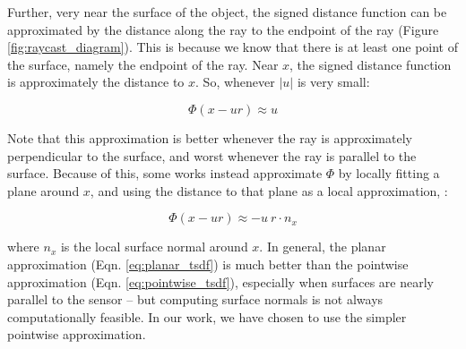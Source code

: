 \documentclass[10pt,twocolumn,letterpaper]{article}
\begin{document}
Further, very near the surface of the object, the signed distance function can
be approximated by the distance along the ray to the endpoint of  the ray
(Figure \ref{fig:raycast_diagram}). This is because we know that there is at
least one point of the surface, namely the endpoint of the ray.  Near $x$, the
signed distance function is approximately the distance to $x$. So, whenever
$|u|$ is very small:

\begin{equation} 
\label{eq:pointwise_tsdf} 
	\Phi(x - ur) \approx u 
\end{equation}

Note that this approximation is better whenever the ray is approximately
perpendicular to the surface, and worst whenever the ray is parallel to the
surface. Because of this, some works \cite{Bylow2013} instead approximate
$\Phi$ by locally fitting a plane around $x$, and using the distance to that
plane as a local approximation, \ie:

\begin{equation} 
\label{eq:planar_tsdf} 
	\Phi(x - ur) \approx -u~r \cdot n_x
\end{equation}

\noindent where $n_x$ is the local surface normal around $x$. In general, the
planar approximation (Eqn. \ref{eq:planar_tsdf}) is much better than the
pointwise approximation (Eqn. \ref{eq:pointwise_tsdf}), especially when surfaces
are nearly parallel to the sensor -- but computing surface normals is not
always computationally feasible. In our work, we have chosen to use
the simpler pointwise approximation.
\end{document}
